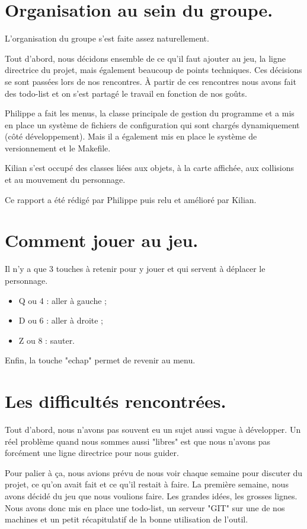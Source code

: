 \section{Organisation au sein du groupe.}

L'organisation du groupe s'est faite assez naturellement.

Tout d'abord, nous décidons ensemble de ce qu'il faut ajouter au jeu, 
la ligne directrice du projet, mais également beaucoup de points techniques.
Ces décisions se sont passées lors de nos rencontres.
À partir de ces rencontres nous avons fait des todo-list et on s'est partagé le travail en fonction de nos goûts.

Philippe a fait les menus, la classe principale de gestion du programme et a mis en place un système de fichiers de configuration qui sont chargés dynamiquement (côté développement).
Mais il a également mis en place le système de versionnement et le Makefile.

Kilian s'est occupé des classes liées aux objets, à la carte affichée, aux collisions et au mouvement du personnage.

Ce rapport a été rédigé par Philippe puis relu et amélioré par Kilian.

\section{Comment jouer au jeu.}

Il n'y a que 3 touches à retenir pour y jouer et qui servent à déplacer le personnage.

\begin{itemize}
	\item Q ou 4 : aller à gauche ;
	\item D ou 6 : aller à droite ;
	\item Z ou 8 : sauter.
\end{itemize}

Enfin, la touche "echap" permet de revenir au menu.

\section{Les difficultés rencontrées.}

Tout d'abord, nous n'avons pas souvent eu un sujet aussi vague à développer.
Un réel problème quand nous sommes aussi "libres" est que nous n'avons pas forcément une ligne directrice pour nous guider.

Pour palier à ça, nous avions prévu de nous voir chaque semaine pour discuter du projet, ce qu'on avait fait et ce qu'il restait à faire.
La première semaine, nous avons décidé du jeu que nous voulions faire.
Les grandes idées, les grosses lignes.
Nous avons donc mis en place une todo-list, un serveur "GIT" sur une de nos machines et un petit récapitulatif de la bonne utilisation de l'outil.

